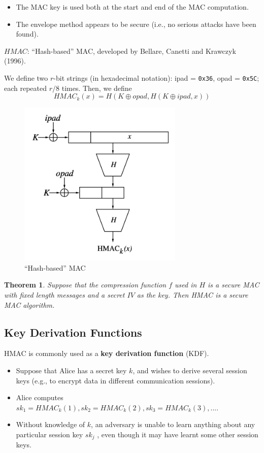 \documentclass[12pt,titlepage]{article}
\newtheorem{prototheorem}{Theorem}[section]
\newenvironment{theorem}
{\colorlet{shadecolor}{orange!15}\begin{shaded}\begin{prototheorem}\normalfont}{\end{prototheorem}\end{shaded}}
\begin{document}
\begin{itemize}
	\item The MAC key is used both at the start and end of the MAC computation.
	\item The envelope method appears to be secure (i.e., no serious attacks have been found).
\end{itemize}

$HMAC$: ``Hash-based'' MAC, developed by Bellare, Canetti and Krawczyk (1996).

We define two $r$-bit strings (in hexadecimal notation): ipad = \texttt{0x36}, opad = \texttt{0x5C}; each repeated $r/8$ times. Then, we define $$HMAC_k (x) = H(K \oplus opad, H(K \oplus ipad, x))$$

\begin{center}
	\begin{figure}[h!]
		\centering
		\includegraphics[width=0.7\textwidth]{HMAC.png}
		\caption{``Hash-based'' MAC}
	\end{figure}
\end{center}

\begin{theorem}
	Suppose that the compression function $f$ used in $H$ is a secure MAC with fixed length messages and a secret $IV$ as the key. Then HMAC is a secure MAC algorithm.
\end{theorem}

\subsection{Key Derivation Functions}
HMAC is commonly used as a \textbf{key derivation function} (KDF).
\begin{itemize}
	\item Suppose that Alice has a secret key $k$, and wishes to derive several session keys (e.g., to encrypt data in different communication sessions).
	\item Alice computes $sk_1 = HMAC_k (1), sk_2 = HMAC_k (2), sk_3 = HMAC_k(3), ...$.
	\item Without knowledge of $k$, an adversary is unable to learn anything about any particular session key $sk_j$ , even though it may have learnt some other session keys.
\end{itemize}
\end{document}
